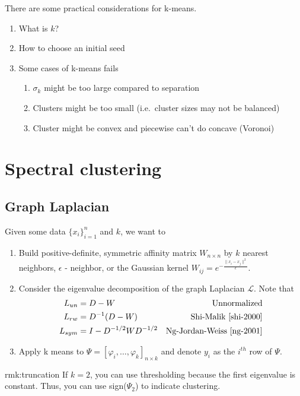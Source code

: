 \documentclass[12pt]{article}
\theoremstyle{plain}
\begin{document}
There are some practical considerations for k-means.
\begin{enumerate}
  \item What is $ k $?
  \item How to choose an initial seed
  \item Some cases of k-means fails
  \begin{enumerate}
    \item $ \sigma_k $ might be too large compared to separation
    \item Clusters might be too small (i.e.\ cluster sizes may not be balanced)
    \item Cluster might be convex and piecewise can't do concave (Voronoi)
  \end{enumerate}
\end{enumerate}

\section{Spectral clustering}
\label{sec:spectral}

\subsection{Graph Laplacian}

Given some data $ \{ x_i \}_{i = 1}^n $ and $ k $, we want to
\begin{enumerate}
  \item Build positive-definite, symmetric affinity matrix $ W_{n \times n} $ by $ k $ nearest neighbors, $ \epsilon $ - neighbor, or the Gaussian kernel $ W_{ij} = e^{- \frac{\| x_i - x_j \|^2}{\epsilon}} $.
  \item Consider the eigenvalue decomposition of the graph Laplacian $ \mathcal{L} $.
  Note that
  \begin{align*}
    L_{un} &= D - W  & \text{Unnormalized} \\
    L_{rw} &= D^{-1} (D - W) & \text{Shi-Malik~\cite{shi-2000}} \\
    L_{sym} &= I - D^{-1/2} W D^{-1/2} & \text{Ng-Jordan-Weiss~\cite{ng-2001}}
  \end{align*}
  \item Apply k means to $ \Psi = [\varphi_i, \ldots, \varphi_k]_{n \times k} $ and denote $ y_i $ as the $ i^{th} $ row of $ \Psi $.
\end{enumerate}

\begin{rmk}[Thresholding]{rmk:truncation}
  If $ k = 2$, you can use thresholding because the first eigenvalue is constant. Thus, you can use sign($\Psi_2$) to indicate clustering.
\end{rmk}
\end{document}
